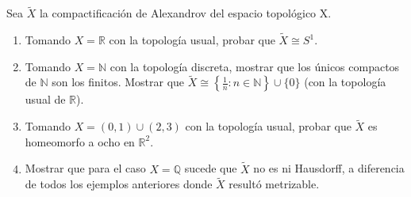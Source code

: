 \documentclass{article}
\theoremstyle{plain}
\theoremstyle{definition}
\newcommand{\R}{\mathbb{R}}
\newcommand{\N}{\mathbb{N}}
\newcommand{\Q}{\mathbb{Q}}
\newenvironment{ejercicio}[1]{\begin{trivlist}
\item[\hskip \labelsep {\bfseries Ejercicio}\hskip \labelsep {\bfseries #1.}]}{\end{trivlist}}
\begin{document}
\begin{ejercicio}{12}
    Sea \( \tilde{X} \) la compactificación de Alexandrov del espacio topológico X.
    \begin{enumerate}
        \item[(a)] Tomando \( X=\R \) con la topología usual, probar que \( \tilde{X}\cong S^{1} \).
        \item[(b)] Tomando \( X=\N \) con la topología discreta, mostrar que los únicos compactos de \( \N \) son los finitos. Mostrar que \( \tilde{X} \cong \left \{ \frac{1}{n} : n \in \N \right \} \cup \{ 0 \} \) (con la topología usual de \( \R \)).
        \item[(c)] Tomando \( X=(0,1)\cup(2,3) \) con la topología usual, probar que \( \tilde{X} \) es homeomorfo a ocho en \( \R^{2} \).
        \item[(d)] Mostrar que para el caso \( X=\Q \) sucede que \( \tilde{X} \) no es ni Hausdorff, a diferencia de todos los ejemplos anteriores donde \( \tilde{X} \) resultó metrizable.
    \end{enumerate}
\end{ejercicio}
\end{document}
